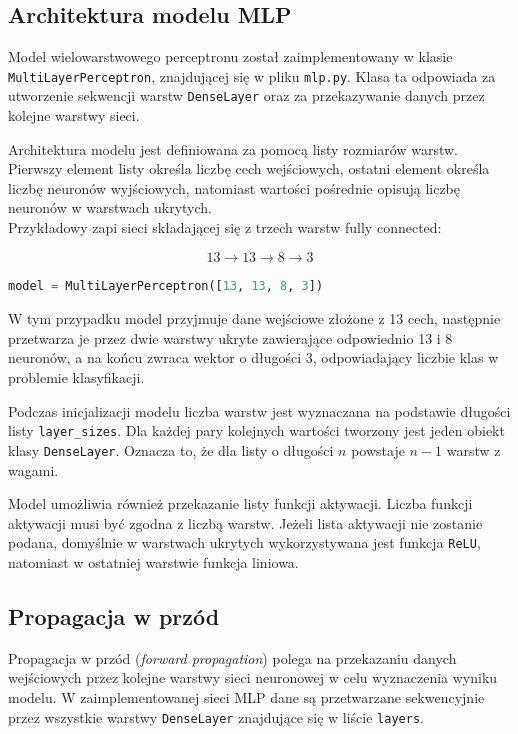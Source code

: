 \subsection{Architektura modelu MLP}

Model wielowarstwowego perceptronu został zaimplementowany w klasie
\texttt{MultiLayerPerceptron}, znajdującej się w pliku \texttt{mlp.py}.
Klasa ta odpowiada za utworzenie sekwencji warstw \texttt{DenseLayer} oraz
za przekazywanie danych przez kolejne warstwy sieci.

Architektura modelu jest definiowana za pomocą listy rozmiarów warstw.
Pierwszy element listy określa liczbę cech wejściowych, ostatni element
określa liczbę neuronów wyjściowych, natomiast wartości pośrednie opisują
liczbę neuronów w warstwach ukrytych.\\ Przykładowy zapi sieci składającej się z trzech warstw fully connected:

\[
    13 \rightarrow 13 \rightarrow 8 \rightarrow 3
\]

\begin{lstlisting}[language=Python]
model = MultiLayerPerceptron([13, 13, 8, 3])
\end{lstlisting}

\vspace{5mm}

W tym przypadku model przyjmuje dane wejściowe złożone z 13 cech,
następnie przetwarza je przez dwie warstwy ukryte zawierające odpowiednio
13 i 8 neuronów, a na końcu zwraca wektor o długości 3, odpowiadający
liczbie klas w problemie klasyfikacji.

Podczas inicjalizacji modelu liczba warstw jest wyznaczana na podstawie
długości listy \texttt{layer\_sizes}. Dla każdej pary kolejnych wartości
tworzony jest jeden obiekt klasy \texttt{DenseLayer}. Oznacza to, że dla
listy o długości \(n\) powstaje \(n-1\) warstw z wagami.

Model umożliwia również przekazanie listy funkcji aktywacji. Liczba funkcji
aktywacji musi być zgodna z liczbą warstw. Jeżeli lista aktywacji nie
zostanie podana, domyślnie w warstwach ukrytych wykorzystywana jest funkcja
\texttt{ReLU}, natomiast w ostatniej warstwie funkcja liniowa.


\subsection{Propagacja w przód}

\begin{flushleft}
Propagacja w przód (\textit{forward propagation}) polega na przekazaniu
danych wejściowych przez kolejne warstwy sieci neuronowej w celu wyznaczenia
wyniku modelu. W zaimplementowanej sieci MLP dane są przetwarzane
sekwencyjnie przez wszystkie warstwy \texttt{DenseLayer} znajdujące się
w liście \texttt{layers}.
\end{flushleft}

